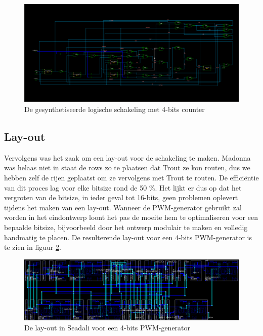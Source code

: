 \documentclass{article}
\begin{document}
\begin{figure}[H]
	\centering
	\includegraphics[width=\textwidth]{resource/pwm_gen_logic.png}
	\caption{De gesynthetiseerde logische schakeling met 4-bits counter}
	\label{fig:pwm-logic}
\end{figure}

\subsection{Lay-out}
\label{ssec:pwm-impl-layout}
Vervolgens was het zaak om een lay-out voor de schakeling te maken. Madonna was helaas niet in staat de rows zo te plaatsen dat Trout ze kon routen, dus we hebben zelf de rijen geplaatst om ze vervolgens met Trout te routen. De efficiëntie van dit proces lag voor elke bitsize rond de 50 \%. Het lijkt er dus op dat het vergroten van de bitsize, in ieder geval tot 16-bits, geen problemen oplevert tijdens het maken van een lay-out. Wanneer de PWM-generator gebruikt zal worden in het eindontwerp loont het pas de moeite hem te optimaliseren voor een bepaalde bitsize, bijvoorbeeld door het ontwerp modulair te maken en volledig handmatig te placen.
De resulterende lay-out voor een 4-bits PWM-generator is te zien in figuur \ref{fig:pwm-layout}.

\begin{figure}[H]
	\centering
	\includegraphics[width=\textwidth]{resource/pwm_gen_layout.png}
	\caption{De lay-out in Seadali voor een 4-bits PWM-generator}
	\label{fig:pwm-layout}
\end{figure}
\end{document}
